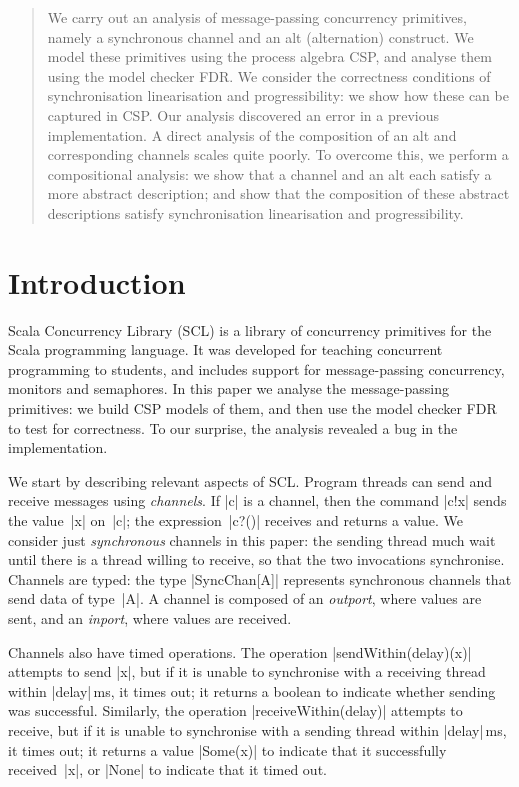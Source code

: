 \begin{abstract}
We carry out an analysis of message-passing concurrency primitives, namely a
synchronous channel and an alt (alternation) construct.  We model these
primitives using the process algebra CSP, and analyse them using the model
checker FDR.  We consider the correctness conditions of synchronisation
linearisation and progressibility: we show how these can be captured in CSP.
Our analysis discovered an error in a previous implementation.  A direct
analysis of the composition of an alt and corresponding channels scales quite
poorly.  To overcome this, we perform a compositional analysis: we show that
a channel and an alt each satisfy a more abstract description; and show that
the composition of these abstract descriptions satisfy synchronisation
linearisation and progressibility.
\end{abstract}


\section{Introduction}

Scala Concurrency Library (SCL) is a library of concurrency primitives for the
Scala programming language.  It was developed for teaching concurrent
programming to students, and includes support for message-passing concurrency,
monitors and semaphores.  In this paper we analyse the message-passing
primitives: we build CSP models of them, and then use the model checker FDR to
test for correctness.  To our surprise, the analysis revealed a bug in the
implementation.

We start by describing relevant aspects of SCL\@.  Program threads can send
and receive messages using \emph{channels}.  If |c| is a channel, then the
command |c!x| sends the value~|x| on~|c|; the expression~|c?()| receives and
returns a value.  We consider just \emph{synchronous} channels in this paper:
the sending thread much wait until there is a thread willing to receive, so
that the two invocations synchronise.  Channels are typed: the type
|SyncChan[A]| represents synchronous channels that send data of type~|A|.  A
channel is composed of an \emph{outport}, where values are sent, and an
\emph{inport}, where values are received.

Channels also have timed operations.  The operation |sendWithin(delay)(x)|
attempts to send |x|, but if it is unable to synchronise with a receiving
thread within |delay|\,ms, it times out; it returns a boolean to indicate
whether sending was successful.  Similarly, the operation
|receiveWithin(delay)| attempts to receive, but if it is unable to synchronise
with a sending thread within |delay|\,ms, it times out; it returns a value
|Some(x)| to indicate that it successfully received~|x|, or |None| to indicate
that it timed out.

